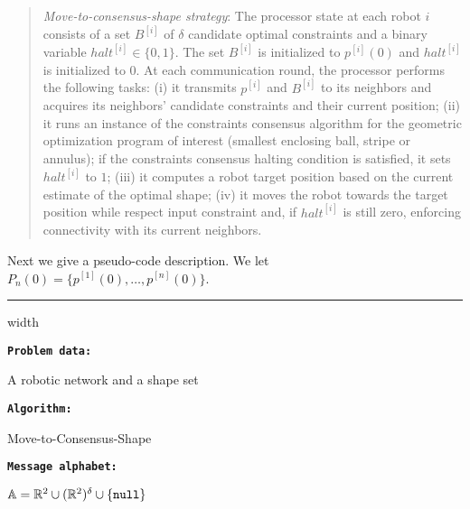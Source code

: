 \documentclass[onecolumn,journal,letterpaper]{IEEEtran}
\newcommand{\real}{{\mathbb{R}}}
\newcommand{\union}{\cup}
\newcommand{\alphabet}{\mathbb{A}}
\newcommand{\supind}[2]{{#1}^{[#2]}}
\newcommand{\nll}{\textup{\texttt{null}}\xspace}
\begin{document}
\begin{quote}
  \emph{Move-to-consensus-shape strategy}: The processor state at each
  robot $i$ consists of a set $\supind{B}{i}$ of $\delta$ candidate optimal
  constraints and a binary variable $\supind{halt}{i}\in\{0,1\}$.  The set
  $\supind{B}{i}$ is initialized to $\supind{p}{i}(0)$ and
  $\supind{halt}{i}$ is initialized to $0$. At each communication round,
  the processor performs the following tasks: (i) it transmits
  $\supind{p}{i}$ and $\supind{B}{i}$ to its neighbors and acquires its
  neighbors' candidate constraints and their current position; (ii) it runs
  an instance of the constraints consensus algorithm for the geometric
  optimization program of interest (smallest enclosing ball, stripe or
  annulus); if the constraints consensus halting condition is satisfied, it
  sets $\supind{halt}{i}$ to $1$; (iii) it computes a robot target position
  based on the current estimate of the optimal shape; (iv) it moves the
  robot towards the target position while respect input constraint and, if
  $\supind{halt}{i}$ is still zero, enforcing connectivity with its current
  neighbors.
\end{quote}

Next we give a pseudo-code description.  We let
$P_n(0)=\{\supind{p}{1}(0),\ldots,\supind{p}{n}(0)\}$.

\bigskip\bigskip
\bigskip \hrule width \linewidth \smallskip

\noindent\begin{minipage}{0.44\linewidth}\textbf{\texttt{Problem data:}}\end{minipage}\begin{minipage}[t]{0.56\linewidth} A robotic network and a shape set\end{minipage}

\noindent\begin{minipage}{0.44\linewidth}\textbf{\texttt{Algorithm:}}\end{minipage}\begin{minipage}{0.56\linewidth}Move-to-Consensus-Shape\end{minipage}

\noindent\begin{minipage}{0.44\linewidth}\textbf{\texttt{Message
      alphabet:}}\end{minipage}\begin{minipage}{0.56\linewidth}$\alphabet = \real^2 \union (\real^2)^\delta \union \{\nll\}$\end{minipage}
\end{document}
